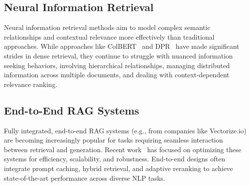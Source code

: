 \subsection{Neural Information Retrieval}
Neural information retrieval methods aim to model complex semantic relationships and contextual relevance more effectively than traditional approaches.
While approaches like ColBERT~\cite{colbert-3} and DPR~\cite{dpr-4} have made significant strides in dense retrieval, they continue to struggle with nuanced information seeking behaviors, involving hierarchical relationships, managing distributed information across multiple documents, and dealing with context-dependent relevance ranking.

\subsection{End-to-End RAG Systems}
Fully integrated, end-to-end RAG systems (e.g., from companies like Vectorize.io) are becoming increasingly popular for tasks requiring seamless interaction between retrieval and generation. Recent work~\cite{10.1145/3626772.3657957} has focused on optimizing these systems for efficiency, scalability, and robustness. End-to-end designs often integrate prompt caching, hybrid retrieval, and adaptive reranking to achieve state-of-the-art performance across diverse NLP tasks. 


